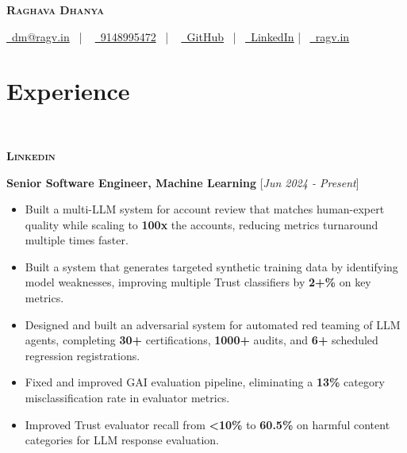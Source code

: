 \documentclass[10pt]{article}
\renewcommand{\textbf}[1]{{\bfseries\color{accent_darkest}#1}}
\newenvironment{leftindented}%
  {\list{}{\leftmargin=0.5in}\item[]}%
  {\endlist}
\begin{document}
\thispagestyle{empty}


\begin{center}
 \textbf{\textsc{\color{anotherred}\Huge Raghava Dhanya}}\\[10pt] %
\end{center}

\begin{center}
 \href{mailto:dm@ragv.in}{\faEnvelope\ dm@ragv.in}
 \ | \ %
 \href{tel:9148995472}{\faPhoneSquare\ 9148995472} \ | \ %
 \href{https://github.com/RaghavaDhanya}{ \underline{\faGithubSquare\
 GitHub}} \ | \ \href{https://in.linkedin.com/in/raghavadhanya}{\underline
 {\faLinkedinSquare\ LinkedIn}} 
 | \ \href{https://ragv.in}{\underline
 {\faExternalLinkSquare\ ragv.in}} 
\end{center}


\section*{Experience}
\ 

\large\textsc{\textbf{Linkedin}}\normalsize%
\begin{leftindented}
\textbf{Senior Software Engineer, Machine Learning} \hfill \textcolor{grey_darker}{[\textit{Jun 2024 - Present}]}
\begin{itemize}
    \itemsep0em
    \item Built a multi-LLM system for account review that matches human-expert quality while scaling to \textbf{100x} the accounts, reducing metrics turnaround multiple times faster.
    \item Built a system that generates targeted synthetic training data by identifying model weaknesses, improving multiple Trust classifiers by \textbf{2+\%} on key metrics.
    \item Designed and built an adversarial system for automated red teaming of LLM agents, completing \textbf{30+} certifications, \textbf{1000+} audits, and \textbf{6+} scheduled regression registrations.
    \item Fixed and improved GAI evaluation pipeline, eliminating a \textbf{13\%} category misclassification rate in evaluator metrics.
    \item Improved Trust evaluator recall from \textbf{<10\%} to \textbf{60.5\%} on harmful content categories for LLM response evaluation.
\end{itemize}
\end{leftindented}
\end{document}
